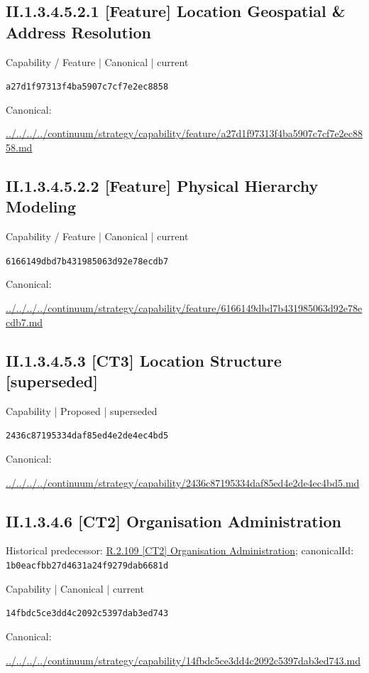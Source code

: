 \documentclass[10pt,a4paper]{article}
\begin{document}
\subsection*{II.1.3.4.5.2.1 [Feature] Location Geospatial \& Address Resolution}
\label{element-a27d1f97313f4ba5907c7cf7e2ec8858}
{\small Capability / Feature | Canonical | current}\par
\texttt{a27d1f97313f4ba5907c7cf7e2ec8858}\par
Canonical: \par
{\footnotesize\url{../../../../continuum/strategy/capability/feature/a27d1f97313f4ba5907c7cf7e2ec8858.md}}\par
\subsection*{II.1.3.4.5.2.2 [Feature] Physical Hierarchy Modeling}
\label{element-6166149dbd7b431985063d92e78ecdb7}
{\small Capability / Feature | Canonical | current}\par
\texttt{6166149dbd7b431985063d92e78ecdb7}\par
Canonical: \par
{\footnotesize\url{../../../../continuum/strategy/capability/feature/6166149dbd7b431985063d92e78ecdb7.md}}\par
\subsection*{II.1.3.4.5.3 [CT3] Location Structure [superseded]}
\label{element-2436c87195334daf85ed4e2de4ec4bd5}
{\small Capability | Proposed | superseded}\par
\texttt{2436c87195334daf85ed4e2de4ec4bd5}\par
Canonical: \par
{\footnotesize\url{../../../../continuum/strategy/capability/2436c87195334daf85ed4e2de4ec4bd5.md}}\par
\subsection*{II.1.3.4.6 [CT2] Organisation Administration}
Historical predecessor: \hyperref[element-1b0eacfbb27d4631a24f9279dab6681d]{R.2.109 [CT2] Organisation Administration}; canonicalId: \texttt{1b0eacfbb27d4631a24f9279dab6681d}\par
\label{element-14fbdc5ce3dd4c2092c5397dab3ed743}
{\small Capability | Canonical | current}\par
\texttt{14fbdc5ce3dd4c2092c5397dab3ed743}\par
Canonical: \par
{\footnotesize\url{../../../../continuum/strategy/capability/14fbdc5ce3dd4c2092c5397dab3ed743.md}}\par
\end{document}
